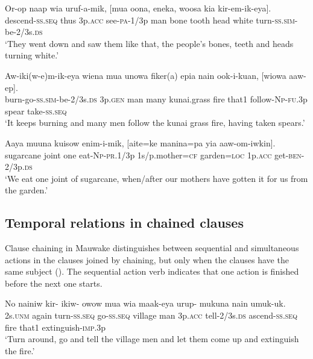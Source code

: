 \ea%
\label{ex:8:x1471}
\gll Or-op  naap  wia  uruf-a-mik,  [mua  oona,  eneka,  woosa kia  kir-em-ik-eya]. \\
descend-\textsc{ss}.\textsc{seq} thus 3p.\textsc{acc} see-\textsc{pa}-1/3p man  bone  tooth  head white  turn-\textsc{ss}.\textsc{sim}-be-2/3s.\textsc{ds}\\
\glt`They went down and saw them like that, the people's bones, teeth and heads turning white.'
\z


\ea%
\label{ex:8:x1469}
\gll Aw-iki(w-e)m-ik-eya  wiena  mua  unowa  fiker(a)  epia nain  ook-i-kuan,  [wiowa  aaw-ep].\\
burn-go-\textsc{ss}.\textsc{sim}-be-2/3s.\textsc{ds} 3p.\textsc{gen} man  many  kunai.grass  fire that1 follow-\textsc{Np}-\textsc{fu}.3p  spear  take-\textsc{ss}.\textsc{seq}\\
\glt`It keeps burning and many men follow the kunai grass fire, having taken spears.'
\z


\ea%
\label{ex:8:x1470}
\gll Aaya  muuna  kuisow  enim-i-mik,  [aite=ke manina=pa  yia  aaw-om-iwkin].   \\
sugarcane  joint  one  eat-\textsc{Np}-\textsc{pr}.1/3p 1s/p.mother=\textsc{cf} garden=\textsc{loc} 1p.\textsc{acc} get-\textsc{ben}-2/3p.\textsc{ds}\\
\glt`We eat one joint of sugarcane, when/after our mothers have gotten it for us from the garden.'
\z


\subsection{Temporal relations in chained clauses}

Clause chaining in Mauwake distinguishes between sequential and simultaneous actions in the clauses joined by chaining, but only when the clauses have the same subject (). The sequential action verb  indicates that one action is finished before the next one starts. 

\ea%
\label{ex:8:x1431}
\gll No  nainiw  kir-  ikiw-  owow  mua  wia maak-eya  urup-  mukuna  nain  umuk-uk. \\
2s.\textsc{unm} again  turn-\textsc{ss}.\textsc{seq} go-\textsc{ss}.\textsc{seq} village  man  3p.\textsc{acc} tell-2/3s.\textsc{ds}  ascend-\textsc{ss}.\textsc{seq} fire  that1 extinguish-\textsc{imp}.3p\\
\glt`Turn around, go and tell the village men and let them come up and extinguish the fire.'
\z


